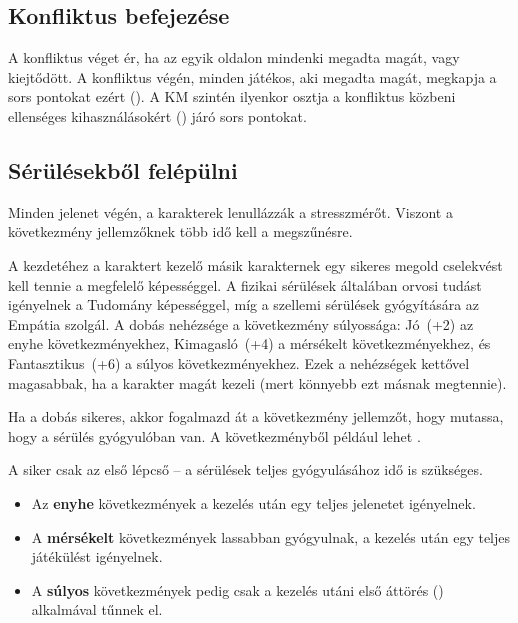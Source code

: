 \subsection{Konfliktus befejezése}

A konfliktus véget ér, ha az egyik oldalon mindenki megadta magát, vagy kiejtődött. A konfliktus végén, minden játékos, aki megadta magát, megkapja a sors pontokat ezért (). A KM szintén ilyenkor osztja a konfliktus közbeni ellenséges kihasználásokért () járó sors pontokat.

\subsection{Sérülésekből felépülni}

Minden jelenet végén, a karakterek lenullázzák a stresszmérőt. Viszont a következmény jellemzőknek több idő kell a megszűnésre.

A  kezdetéhez a karaktert kezelő másik karakternek egy sikeres megold cselekvést kell tennie a megfelelő képességgel. A fizikai sérülések általában orvosi tudást igényelnek a Tudomány képességgel, míg a szellemi sérülések gyógyítására az Empátia szolgál. A dobás nehézsége a következmény súlyossága: Jó~(+2) az enyhe következményekhez, Kimagasló~(+4) a mérsékelt következményekhez, és Fantasztikus~(+6) a súlyos következményekhez. Ezek a nehézségek kettővel magasabbak, ha a karakter magát kezeli (mert könnyebb ezt másnak megtennie).

Ha a dobás sikeres, akkor fogalmazd át a következmény jellemzőt, hogy mutassa, hogy a sérülés gyógyulóban van. A  következményből például lehet .

A siker csak az első lépcső -- a sérülések teljes gyógyulásához idő is szükséges.

\begin{itemize}
    \item Az \textbf{enyhe} következmények a kezelés után egy teljes jelenetet igényelnek.
    \item A \textbf{mérsékelt} következmények lassabban gyógyulnak, a kezelés után egy teljes játékülést igényelnek.
    \item A \textbf{súlyos} következmények pedig csak a kezelés utáni első áttörés () alkalmával tűnnek el.
\end{itemize}
